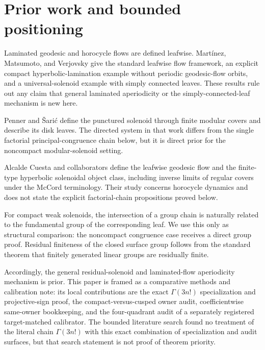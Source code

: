 \documentclass[11pt]{article}
\theoremstyle{definition}
\theoremstyle{remark}
\begin{document}
\section{Prior work and bounded positioning}

Laminated geodesic and horocycle flows are defined leafwise. Martínez, Matsumoto, and Verjovsky give the standard leafwise flow framework, an explicit compact hyperbolic-lamination example without periodic geodesic-flow orbits, and a universal-solenoid example with simply connected leaves.
\citep[Section~2.2 and Examples~4, 6]{martinez2016}
These results rule out any claim that general laminated aperiodicity or the simply-connected-leaf mechanism is new here.

Penner and Šarić define the punctured solenoid through finite modular covers and describe its disk leaves.
\citep[Introduction and Definition~2.1]{penner2008}
The directed system in that work differs from the single factorial principal-congruence chain below, but it is direct prior for the noncompact modular-solenoid setting.

Alcalde Cuesta and collaborators define the leafwise geodesic flow and the finite-type hyperbolic solenoidal object class, including inverse limits of regular covers under the McCord terminology.
\citep[Definitions~4, 5, and 7]{alcalde2026}
Their study concerns horocycle dynamics and does not state the explicit factorial-chain propositions proved below.

For compact weak solenoids, the intersection of a group chain is naturally related to the fundamental group of the corresponding leaf.
\citep[Definition~5.5]{hurder2019}
We use this only as structural comparison: the noncompact congruence case receives a direct group proof. Residual finiteness of the closed surface group follows from the standard theorem that finitely generated linear groups are residually finite.
\citep[p.~1]{nica2013}

Accordingly, the general residual-solenoid and laminated-flow aperiodicity mechanism is prior. This paper is framed as a comparative methods and calibration note: its local contributions are the exact $\Gamma(3n!)$ specialization and projective-sign proof, the compact-versus-cusped owner audit, coefficientwise same-owner bookkeeping, and the four-quadrant audit of a separately registered target-matched calibrator. The bounded literature search found no treatment of the literal chain $\Gamma(3n!)$ with this exact combination of specialization and audit surfaces, but that search statement is not proof of theorem priority.
\end{document}
